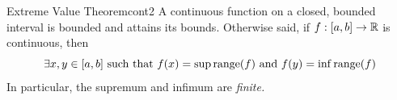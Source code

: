 


\begin{thm}{Extreme Value Theorem}{cont2}
A continuous function on a closed, bounded interval is bounded and attains its bounds. Otherwise said, if $f:[a,b]\to\mathbb{R}$ is continuous, then
\[\exists x,y\in [a,b]\text{ such that }f(x)=\sup\operatorname{range}(f)\ \text{and}\  f(y)=\inf\operatorname{range}(f)\]
In particular, the supremum and infimum are \emph{finite.}
\end{thm}







